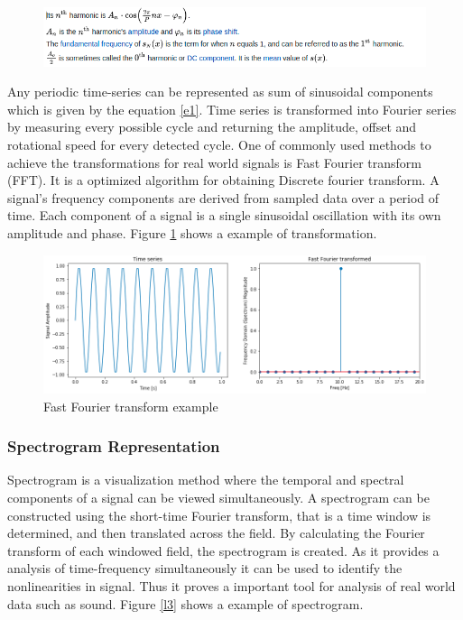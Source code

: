       \begin{figure}[h]
      	\centering
      	\includegraphics[width=0.75\linewidth]{images/fse.png}
    
      \end{figure}
    Any periodic time-series can be represented as sum of sinusoidal components which is given by the equation \ref{e1}. Time series is transformed into Fourier series by measuring every possible cycle and returning the amplitude, offset and rotational speed for every detected cycle. One of commonly used methods to achieve the transformations for real world signals is Fast Fourier transform (FFT). It is a optimized algorithm for obtaining Discrete fourier transform. A signal's frequency components are derived from sampled data over a period of time. Each component of a signal is a single sinusoidal oscillation with its own amplitude and phase.
    Figure \ref{l2} shows a example of transformation. 
    \begin{figure}[h]
        	\centering
        	\includegraphics[width=0.75\linewidth]{images/fft.png}
        	\caption{Fast Fourier transform example \cite{imgfft}}
        	\label{l2}
    \end{figure}

    \subsubsection{Spectrogram Representation}
    Spectrogram is a visualization method where the temporal and spectral components of a signal can be viewed simultaneously. A spectrogram can be constructed using the short-time Fourier transform, that is a time window is determined, and then translated across the field. By calculating the Fourier transform of each windowed field, the spectrogram is created. As it provides a analysis of time-frequency simultaneously it can be used to identify the nonlinearities in signal. Thus it proves a important tool for analysis of real world data such as sound.  Figure \ref{l3} shows a example of spectrogram.
    
